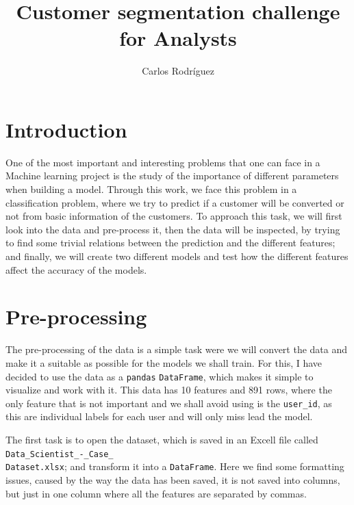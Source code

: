 \documentclass{article}
\title{Customer segmentation challenge for Analysts}
\author{Carlos Rodríguez}
\begin{document}
\maketitle


\section{Introduction}

One of the most important and interesting problems that one can face in a Machine learning project is the study of the importance of different parameters when building a model. Through this work, we face this problem in a classification problem, where we try to predict if a customer will be converted or not from basic information of the customers. To approach this task, we will first look into the data and pre-process it, then the data will be inspected, by trying to find some trivial relations between the prediction and the different features; and finally, we will create two different models and test how the different features affect the accuracy of the models.

\section{Pre-processing}

The pre-processing of the data is a simple task were we will convert the data and make it a suitable as possible for the models we shall train. For this, I have decided to use the data as a \texttt{pandas} \texttt{DataFrame}, which makes it simple to visualize and work with it. This data has 10 features and 891 rows, where the only feature that is not important and we shall avoid using is the \texttt{user\_id}, as this are individual labels for each user and will only miss lead the model.

The first task is to open the dataset, which is saved in an Excell file called \texttt{Data\_Scientist\_-\_Case\_\\Dataset.xlsx}; and transform it into a \texttt{DataFrame}. Here we find some formatting issues, caused by the way the data has been saved, it is not saved into columns, but just in one column where all the features are separated by commas.
\end{document}
